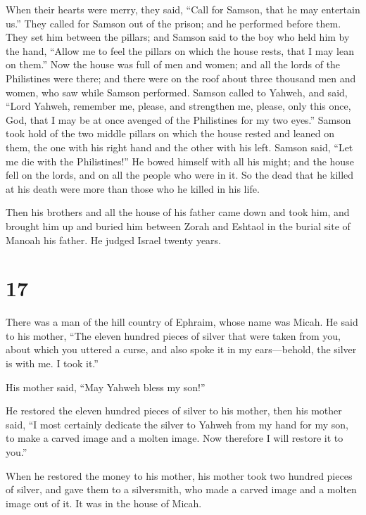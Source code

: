  When their hearts were merry, they said, ``Call for
Samson, that he may entertain us.'' They called for Samson out of the
prison; and he performed before them. They set him between the pillars;
 and Samson said to the boy who held him by the hand,
``Allow me to feel the pillars on which the house rests, that I may lean
on them.''  Now the house was full of men and women; and
all the lords of the Philistines were there; and there were on the roof
about three thousand men and women, who saw while Samson performed.
 Samson called to Yahweh, and said, ``Lord Yahweh,
remember me, please, and strengthen me, please, only this once, God,
that I may be at once avenged of the Philistines for my two eyes.''
 Samson took hold of the two middle pillars on which the
house rested and leaned on them, the one with his right hand and the
other with his left.  Samson said, ``Let me die with the
Philistines!'' He bowed himself with all his might; and the house fell
on the lords, and on all the people who were in it. So the dead that he
killed at his death were more than those who he killed in his life.

 Then his brothers and all the house of his father came
down and took him, and brought him up and buried him between Zorah and
Eshtaol in the burial site of Manoah his father. He judged Israel twenty
years.

\hypertarget{section-16}{%
\section{17}\label{section-16}}

 There was a man of the hill country of Ephraim, whose
name was Micah.  He said to his mother, ``The eleven
hundred pieces of silver that were taken from you, about which you
uttered a curse, and also spoke it in my ears---behold, the silver is
with me. I took it.''

His mother said, ``May Yahweh bless my son!''

 He restored the eleven hundred pieces of silver to his
mother, then his mother said, ``I most certainly dedicate the silver to
Yahweh from my hand for my son, to make a carved image and a molten
image. Now therefore I will restore it to you.''

 When he restored the money to his mother, his mother took
two hundred pieces of silver, and gave them to a silversmith, who made a
carved image and a molten image out of it. It was in the house of Micah.

